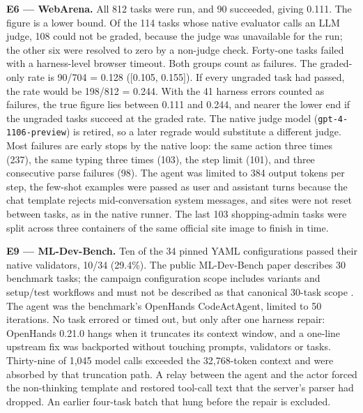 \documentclass[12pt,a4paper]{report}
\begin{document}
\textbf{E6 --- WebArena.} All 812 tasks were run, and 90 succeeded,
giving 0.111. The figure is a lower bound. Of the 114 tasks whose native
evaluator calls an LLM judge, 108 could not be graded, because the judge
was unavailable for the run; the other six were resolved to zero by a
non-judge check. Forty-one tasks failed with a harness-level browser
timeout. Both groups count as failures. The graded-only rate is 90/704 =
0.128 ({[}0.105, 0.155{]}). If every ungraded task had passed, the rate
would be 198/812 = 0.244. With the 41 harness errors counted as
failures, the true figure lies between 0.111 and 0.244, and nearer the
lower end if the ungraded tasks succeed at the graded rate. The native
judge model (\texttt{gpt-4-1106-preview}) is retired, so a later regrade
would substitute a different judge. Most failures are early stops by the
native loop: the same action three times (237), the same typing three
times (103), the step limit (101), and three consecutive parse failures
(98). The agent was limited to 384 output tokens per step, the few-shot
examples were passed as user and assistant turns because the chat
template rejects mid-conversation system messages, and sites were not
reset between tasks, as in the native runner. The last 103
shopping-admin tasks were split across three containers of the same
official site image to finish in time.

\textbf{E9 --- ML-Dev-Bench.} Ten of the 34 pinned YAML configurations
passed their native validators, 10/34 (29.4\%). The public ML-Dev-Bench
paper describes 30 benchmark tasks; the campaign configuration scope
includes variants and setup/test workflows and must not be described as
that canonical 30-task scope \citep{padigela2025mldevbench}. The agent
was the benchmark's OpenHands CodeActAgent, limited to 50 iterations. No
task errored or timed out, but only after one harness repair: OpenHands
0.21.0 hangs when it truncates its context window, and a one-line
upstream fix was backported without touching prompts, validators or
tasks. Thirty-nine of 1,045 model calls exceeded the 32,768-token
context and were absorbed by that truncation path. A relay between the
agent and the actor forced the non-thinking template and restored
tool-call text that the server's parser had dropped. An earlier
four-task batch that hung before the repair is excluded.
\end{document}
